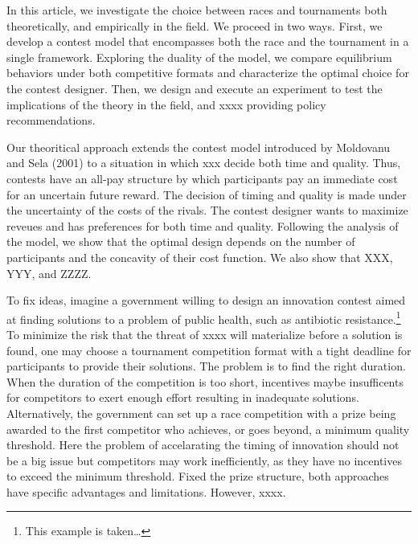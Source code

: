 \documentclass[11pt, titlepage]{article}
\begin{document}
In this article, we investigate the choice between races and tournaments
both theoretically, and empirically in the field. We proceed in two
ways. First, we develop a contest model that encompasses both the race
and the tournament in a single framework. Exploring the duality of the
model, we compare equilibrium behaviors under both competitive formats
and characterize the optimal choice for the contest designer. Then, we
design and execute an experiment to test the implications of the theory
in the field, and xxxx providing policy recommendations.

Our theoritical approach extends the contest model introduced by
Moldovanu and Sela (2001) to a situation in which xxx decide both time
and quality. Thus, contests have an all-pay structure by which
participants pay an immediate cost for an uncertain future reward. The
decision of timing and quality is made under the uncertainty of the
costs of the rivals. The contest designer wants to maximize reveues and
has preferences for both time and quality. Following the analysis of the
model, we show that the optimal design depends on the number of
participants and the concavity of their cost function. We also show that
XXX, YYY, and ZZZZ.

To fix ideas, imagine a government willing to design an innovation
contest aimed at finding solutions to a problem of public health, such
as antibiotic resistance.\footnote{This example is taken\ldots{}} To
minimize the risk that the threat of xxxx will materialize before a
solution is found, one may choose a tournament competition format with a
tight deadline for participants to provide their solutions. The problem
is to find the right duration. When the duration of the competition is
too short, incentives maybe insufficents for competitors to exert enough
effort resulting in inadequate solutions. Alternatively, the government
can set up a race competition with a prize being awarded to the first
competitor who achieves, or goes beyond, a minimum quality threshold.
Here the problem of accelarating the timing of innovation should not be
a big issue but competitors may work inefficiently, as they have no
incentives to exceed the minimum threshold. Fixed the prize structure,
both approaches have specific advantages and limitations. However, xxxx.
\end{document}
